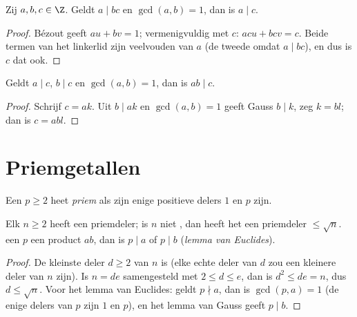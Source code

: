 \begin{theorem}\label{thm:g12:arith:gauss}
Zij $a, b, c \in \Z$. Geldt $a \mid bc$ en $\gcd(a, b) = 1$, dan is
$a \mid c$.
\end{theorem}

\begin{proof}
Bézout geeft $au + bv = 1$; vermenigvuldig met $c$: $acu + bcv = c$. Beide
termen van het linkerlid zijn veelvouden van $a$ (de tweede omdat
$a \mid bc$), en dus is $c$ dat ook.
\end{proof}

\begin{corollary}\label{cor:g12:arith:coprimeprod}
Geldt $a \mid c$, $b \mid c$ en $\gcd(a,b) = 1$, dan is $ab \mid c$.
\end{corollary}

\begin{proof}
Schrijf $c = ak$. Uit $b \mid ak$ en $\gcd(a,b)=1$ geeft Gauss $b \mid k$,
zeg $k = bl$; dan is $c = abl$.
\end{proof}

\section{Priemgetallen}

\begin{definition}[Priem]\label{def:g12:arith:prime}
Een  $p \geq 2$ heet \emph{priem} als zijn enige
positieve delers $1$ en $p$ zijn.
\end{definition}

\begin{proposition}\label{prop:g12:arith:primedivides}
Elk  $n \geq 2$ heeft een priemdeler; is $n$ niet , dan heeft
het een priemdeler $\leq \sqrt n$.  een  $p$ een product $ab$,
dan is $p \mid a$ of $p \mid b$ (\emph{lemma van Euclides}).
\end{proposition}

\begin{proof}
De kleinste deler $d \geq 2$ van $n$ is  (elke echte deler van $d$ zou
een kleinere deler van $n$ zijn). Is $n = de$ samengesteld met
$2 \leq d \leq e$, dan is $d^2 \leq de = n$, dus $d \leq \sqrt n$. Voor het
lemma van Euclides: geldt $p \nmid a$, dan is $\gcd(p, a) = 1$ (de enige
delers van $p$ zijn $1$ en $p$), en het lemma van Gauss geeft $p \mid b$.
\end{proof}

